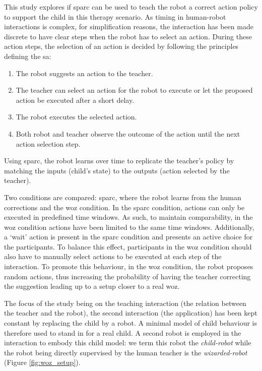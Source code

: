 This study explores if \gls{sparc} can be used to teach the robot a correct action policy to support the child in this therapy scenario. As timing in human-robot interactions is complex, for simplification reasons, the interaction has been made discrete to have clear steps when the robot has to select an action. During these action steps, the selection of an action is decided by following the principles defining the \gls{sa}:
\begin{enumerate}
	\item The robot suggests an action to the teacher.
	\item The teacher can select an action for the robot to execute or let the proposed action be executed after a short delay.
	\item The robot executes the selected action.
	\item Both robot and teacher observe the outcome of the action until the next action selection step.
\end{enumerate}

Using \gls{sparc}, the robot learns over time to replicate the teacher's policy by matching the inputs (child's state) to the outputs (action selected by the teacher). 


Two conditions are compared: \gls{sparc}, where the robot learns from the human corrections and the \gls{woz} condition. In the \gls{sparc} condition, actions can only be executed in predefined time windows. As such, to maintain comparability, in the \gls{woz} condition actions have been limited to the same time windows. Additionally, a `wait' action is present in the \gls{sparc} condition and presents an active choice for the participants. To balance this effect, participants in the \gls{woz} condition should also have to manually select actions to be executed at each step of the interaction. To promote this behaviour, in the \gls{woz} condition, the robot proposes random actions, thus increasing the probability of having the teacher correcting the suggestion leading up to a setup closer to a real \gls{woz}.

The focus of the study being on the teaching interaction (the relation between the teacher and the robot), the second interaction (the application) has been kept constant by replacing the child by a robot. A minimal model of child behaviour is therefore used to stand in for a real child. A second robot is employed in the interaction to embody this child model: we term this robot the \textit{child-robot} while the robot being directly supervised by the human teacher is the \textit{wizarded-robot} (Figure \ref{fig:woz_setup}).

